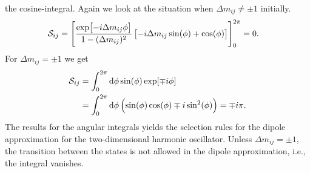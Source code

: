             the cosine-integral.
            Again we look at the situation when $\Delta m_{ij} \neq \pm 1$
            initially.
            \begin{align}
                \mathcal{S}_{ij}
                &= \left[ 
                    \frac{\exp[-i\Delta m_{ij} \phi]}{1 - (\Delta m_{ij})^2}
                    \left[ 
                        -i\Delta m_{ij} \sin(\phi)
                        + \cos(\phi)
                     \right]
                 \right]_{0}^{2\pi}
                = 0.
            \end{align}
            For $\Delta m_{ij} = \pm 1$ we get
            \begin{align}
                \mathcal{S}_{ij}
                &=
                \int_{0}^{2\pi}
                \dd\phi
                \sin(\phi)
                \exp[\mp i\phi]
                \\
                &=
                \int_{0}^{2\pi}
                \dd\phi
                \left( 
                    \sin(\phi)\cos(\phi)
                    \mp i\sin^2(\phi)
                 \right)
                = \mp i\pi.
            \end{align}
            The results for the angular integrals yields the selection rules for
            the dipole approximation for the two-dimensional harmonic
            oscillator.
            Unless $\Delta m_{ij} = \pm 1$, the transition between the states is
            not allowed in the dipole approximation, i.e., the integral
            vanishes.


